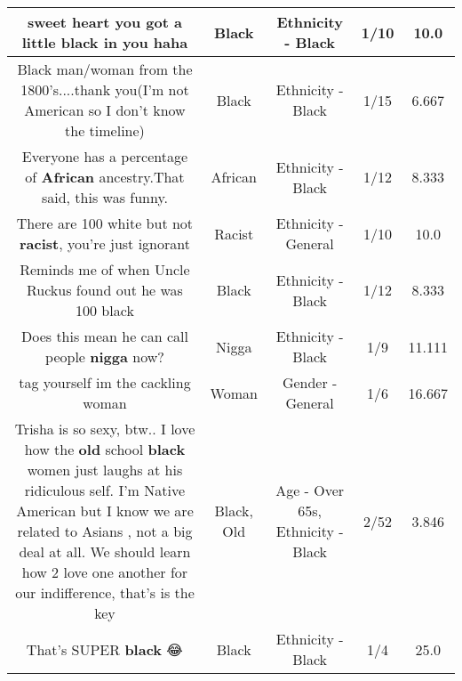 \documentclass[11pt]{article}
\newlength\mylength
\begin{document}
\begin{center}
\begin{longtable}{|C{.65\mylength}|C{.30\mylength}|C{.12\mylength}|C{.12\mylength}|C{.12\mylength}|}
  \small sweet heart you got a little \textbf{black} in you haha\normalsize   & Black & Ethnicity - Black & 1/10 & 10.0 \\  \hline
  \small Black man/woman from the 1800's....thank you(I'm not American so I don't know the timeline)\normalsize   & Black & Ethnicity - Black & 1/15 & 6.667 \\  \hline
  \small Everyone has a percentage of \textbf{African} ancestry.That said, this was funny.\normalsize   & African & Ethnicity - Black & 1/12 & 8.333 \\  \hline
  \small There are 100 white but not \textbf{racist}, you're just ignorant\normalsize   & Racist & Ethnicity - General & 1/10 & 10.0 \\  \hline
  \small Reminds me of when Uncle Ruckus found out he was 100 black\normalsize   & Black & Ethnicity - Black & 1/12 & 8.333 \\  \hline
  \small Does this mean he can call people \textbf{nigga} now?\normalsize   & Nigga & Ethnicity - Black & 1/9 & 11.111 \\  \hline
  \small tag yourself im the cackling woman\normalsize   & Woman & Gender - General & 1/6 & 16.667 \\  \hline
  \small Trisha is so sexy, btw.. I love how the \textbf{old} school \textbf{black} women just laughs at his ridiculous self. I'm Native American but I know we are related to Asians , not a big deal  at all. We should learn how 2 love one another for our indifference,  that's is the key\normalsize   & Black, Old & Age - Over 65s, Ethnicity - Black & 2/52 & 3.846 \\  \hline
  \small That's SUPER \textbf{black} 😂\normalsize   & Black & Ethnicity - Black & 1/4 & 25.0 \\  \hline

\end{longtable}
\end{center}
\end{document}
